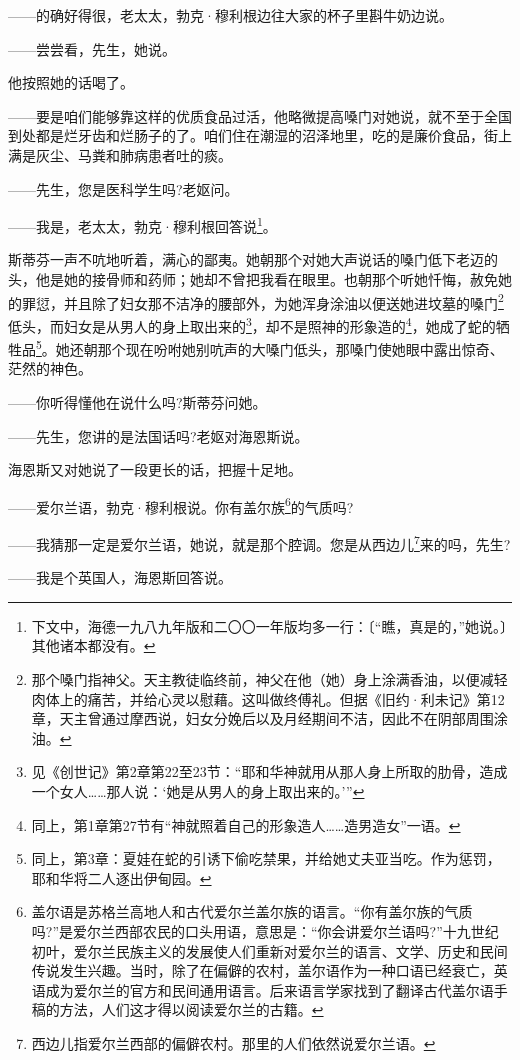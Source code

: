 \par ——的确好得很，老太太，勃克·穆利根边往大家的杯子里斟牛奶边说。
\par ——尝尝看，先生，她说。
\par 他按照她的话喝了。
\par ——要是咱们能够靠这样的优质食品过活，他略微提高嗓门对她说，就不至于全国到处都是烂牙齿和烂肠子的了。咱们住在潮湿的沼泽地里，吃的是廉价食品，街上满是灰尘、马粪和肺病患者吐的痰。
\par ——先生，您是医科学生吗?老妪问。
\par ——我是，老太太，勃克·穆利根回答说\footnote{下文中，海德一九八九年版和二〇〇一年版均多一行：〔“瞧，真是的，”她说。〕其他诸本都没有。}。
\par 斯蒂芬一声不吭地听着，满心的鄙夷。她朝那个对她大声说话的嗓门低下老迈的头，他是她的接骨师和药师；她却不曾把我看在眼里。也朝那个听她忏悔，赦免她的罪愆，并且除了妇女那不洁净的腰部外，为她浑身涂油以便送她进坟墓的嗓门\footnote{那个嗓门指神父。天主教徒临终前，神父在他（她）身上涂满香油，以便减轻肉体上的痛苦，并给心灵以慰藉。这叫做终傅礼。但据《旧约·利未记》第12章，天主曾通过摩西说，妇女分娩后以及月经期间不洁，因此不在阴部周围涂油。}低头，而妇女是从男人的身上取出来的\footnote{见《创世记》第2章第22至23节：“耶和华神就用从那人身上所取的肋骨，造成一个女人……那人说：‘她是从男人的身上取出来的。’”}，却不是照神的形象造的\footnote{同上，第1章第27节有“神就照着自己的形象造人……造男造女”一语。}，她成了蛇的牺牲品\footnote{同上，第3章：夏娃在蛇的引诱下偷吃禁果，并给她丈夫亚当吃。作为惩罚，耶和华将二人逐出伊甸园。}。她还朝那个现在吩咐她别吭声的大嗓门低头，那嗓门使她眼中露出惊奇、茫然的神色。
\par ——你听得懂他在说什么吗?斯蒂芬问她。
\par ——先生，您讲的是法国话吗?老妪对海恩斯说。
\par 海恩斯又对她说了一段更长的话，把握十足地。
\par ——爱尔兰语，勃克·穆利根说。你有盖尔族\footnote{盖尔语是苏格兰高地人和古代爱尔兰盖尔族的语言。“你有盖尔族的气质吗?”是爱尔兰西部农民的口头用语，意思是：“你会讲爱尔兰语吗?”十九世纪初叶，爱尔兰民族主义的发展使人们重新对爱尔兰的语言、文学、历史和民间传说发生兴趣。当时，除了在偏僻的农村，盖尔语作为一种口语已经衰亡，英语成为爱尔兰的官方和民间通用语言。后来语言学家找到了翻译古代盖尔语手稿的方法，人们这才得以阅读爱尔兰的古籍。}的气质吗?
\par ——我猜那一定是爱尔兰语，她说，就是那个腔调。您是从西边儿\footnote{西边儿指爱尔兰西部的偏僻农村。那里的人们依然说爱尔兰语。}来的吗，先生?
\par ——我是个英国人，海恩斯回答说。
